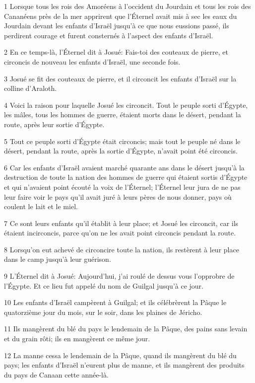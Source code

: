 \par 1 Lorsque tous les rois des Amoréens à l'occident du Jourdain et tous les rois des Cananéens près de la mer apprirent que l'Éternel avait mis à sec les eaux du Jourdain devant les enfants d'Israël jusqu'à ce que nous eussions passé, ils perdirent courage et furent consternés à l'aspect des enfants d'Israël.
\par 2 En ce temps-là, l'Éternel dit à Josué: Fais-toi des couteaux de pierre, et circoncis de nouveau les enfants d'Israël, une seconde fois.
\par 3 Josué se fit des couteaux de pierre, et il circoncit les enfants d'Israël sur la colline d'Araloth.
\par 4 Voici la raison pour laquelle Josué les circoncit. Tout le peuple sorti d'Égypte, les mâles, tous les hommes de guerre, étaient morts dans le désert, pendant la route, après leur sortie d'Égypte.
\par 5 Tout ce peuple sorti d'Égypte était circoncis; mais tout le peuple né dans le désert, pendant la route, après la sortie d'Égypte, n'avait point été circoncis.
\par 6 Car les enfants d'Israël avaient marché quarante ans dans le désert jusqu'à la destruction de toute la nation des hommes de guerre qui étaient sortis d'Égypte et qui n'avaient point écouté la voix de l'Éternel; l'Éternel leur jura de ne pas leur faire voir le pays qu'il avait juré à leurs pères de nous donner, pays où coulent le lait et le miel.
\par 7 Ce sont leurs enfants qu'il établit à leur place; et Josué les circoncit, car ils étaient incirconcis, parce qu'on ne les avait point circoncis pendant la route.
\par 8 Lorsqu'on eut achevé de circoncire toute la nation, ils restèrent à leur place dans le camp jusqu'à leur guérison.
\par 9 L'Éternel dit à Josué: Aujourd'hui, j'ai roulé de dessus vous l'opprobre de l'Égypte. Et ce lieu fut appelé du nom de Guilgal jusqu'à ce jour.
\par 10 Les enfants d'Israël campèrent à Guilgal; et ils célébrèrent la Pâque le quatorzième jour du mois, sur le soir, dans les plaines de Jéricho.
\par 11 Ils mangèrent du blé du pays le lendemain de la Pâque, des pains sans levain et du grain rôti; ils en mangèrent ce même jour.
\par 12 La manne cessa le lendemain de la Pâque, quand ils mangèrent du blé du pays; les enfants d'Israël n'eurent plus de manne, et ils mangèrent des produits du pays de Canaan cette année-là.
